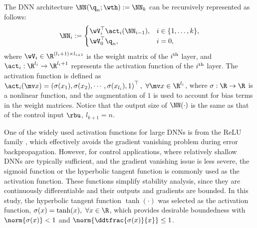 \documentclass[journal]{IEEEtran}
\begin{document}
The DNN architecture $\NN({\q}_n;\wth) := \NN_k$ can be recursively represented as follows:
\begin{equation}
    \NN_i :=
    \begin{cases}
        \wV_i^\top \act_i(\NN_{i-1}), 
        &
        i\in\{1,\dots ,k\},
        \\
        \wV_0^\top {\q}_n,
        &
        i=0
        ,
    \end{cases}
    \label{eq:DNN:architecture}
\end{equation}
where $\wV_i\in\R^{(l_i+1)\times l_{i+1}}$ is the weight matrix of the $i\textsuperscript{th}$ layer, and $\act_i: \R^{l_i}\to\R^{l_i+1}$ represents the activation function of the $i\textsuperscript{th}$ layer. 
The activation function is defined as $\act_i(\mv x)=\left(\sigma(x_1),\sigma(x_2),\cdots, \sigma(x_{l_{i}}), 1\right)^\top,\ \forall\mv x\in\R^{l_i}$, where $\sigma: \R\to\R$ is a nonlinear function, and the augmentation of $1$ is used to account for bias terms in the weight matrices. 
Notice that the output size of $\NN(\cdot)$ is the same as that of the control input $\rbu$, \ie $l_{k+1}=n$. 


One of the widely used activation functions for large DNNs is from the ReLU family \cite{Maas:2013aa}, which effectively avoids the gradient vanishing problem during error backpropagation. 
However, for control applications, where relatively shallow DNNs are typically sufficient, and the gradient vanishing issue is less severe, the sigmoid function or the hyperbolic tangent function is commonly used as the activation function. 
These functions simplify stability analysis, since they are continuously differentiable and their outputs and gradients are bounded. 
In this study, the hyperbolic tangent function $\tanh(\cdot)$ was selected as the activation function, \ie $\sigma(x) = \tanh(x),\ \forall x\in\R$, which provides desirable boundedness with $\norm{\sigma(x)}<1$ and $\norm{\ddtfrac{\sigma(x)}{x}}\le 1$.
\end{document}

